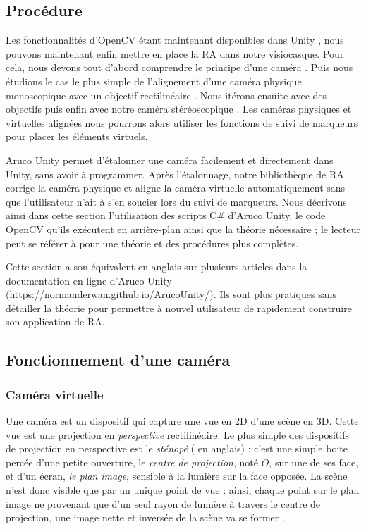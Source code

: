 \subsection{Procédure}
\label{subsec:ar_hmd_procedure}
Les fonctionnalités d'OpenCV étant maintenant disponibles dans Unity , nous pouvons maintenant enfin mettre en place la RA dans notre visiocasque. Pour cela, nous devons tout d'abord comprendre le principe d'une caméra . Puis nous étudions le cas le plus simple de l'alignement d'une caméra physique monoscopique avec un objectif rectilinéaire . Nous itérons ensuite avec des objectifs   puis enfin avec notre caméra stéréoscopique . Les caméras physiques et virtuelles alignées nous pourrons alors utiliser les fonctions de suivi de marqueurs pour placer les éléments virtuels.

Aruco Unity permet d'étalonner une caméra facilement et directement dans Unity, sans avoir à programmer. Après l'étalonnage, notre bibliothèque de RA corrige la caméra physique et aligne la caméra virtuelle automatiquement sans que l'utilisateur n'ait à s'en soucier lors du suivi de marqueurs. Nous décrivons ainsi dans cette section l'utilisation des scripts C\# d'Aruco Unity, le code OpenCV qu'ils exécutent en arrière-plan ainsi que la théorie nécessaire ; le lecteur peut se référer à \cite[chap. 18-19]{Kaehler2017} pour une théorie et des procédures plus complètes.

Cette section a son équivalent en anglais sur plusieurs articles dans la documentation en ligne d'Aruco Unity (\url{https://normanderwan.github.io/ArucoUnity/}). Ils sont plus pratiques sans détailler la théorie pour permettre à nouvel utilisateur de rapidement construire son application de RA.

\subsection{Fonctionnement d'une caméra}
\label{subsec:camera_theory}

\subsubsection{Caméra virtuelle}
Une caméra est un dispositif qui capture une vue en 2D d'une scène en 3D. Cette vue est une projection en \emph{perspective} rectilinéaire. Le plus simple des dispositifs de projection en perspective est le \emph{sténopé} ( en anglais) : c'est une simple boite percée d'une petite ouverture, le \emph{centre de projection}, noté $O$, sur une de ses face, et d'un écran, \emph{le plan image}, sensible à la lumière sur la face opposée. La scène n'est donc visible que par un unique point de vue : ainsi, chaque point sur le plan image ne provenant que d'un seul rayon de lumière à travers le centre de projection, une image nette et inversée de la scène va se former .

